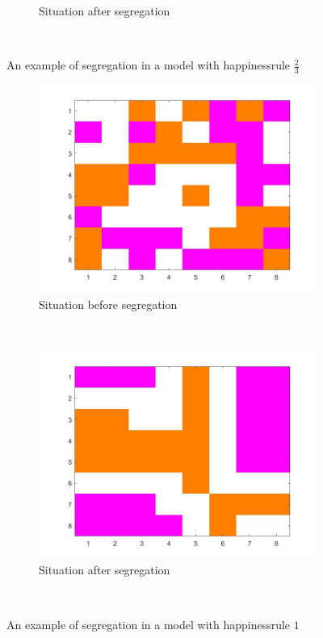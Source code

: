 \begin{figure}[H]
\begin{subfigure}{0.4\textwidth}
        \caption{Situation after segregation}
        \label{fig:example hap 2/3 end}
    \end{subfigure}
    ~ 
    \caption{An example of segregation in a model with happinessrule $\frac{2}{3}$}
    \label{fig:examplehap2/3}
\end{figure}

\begin{figure}[H]
	\centering
    \begin{subfigure}{0.4\textwidth}
        \includegraphics[width=\textwidth]{vb4beginbord.jpg}
        \caption{Situation before segregation}
        \label{fig:example hap 1 begin}
    \end{subfigure}\hspace{0cm}
    ~ 
    \begin{subfigure}{0.4\textwidth}
        \includegraphics[width=\textwidth]{vb4eindbord.jpg}
        \caption{Situation after segregation}
        \label{fig:example hap 1 end}
    \end{subfigure}
    ~ 
    \caption{An example of segregation in a model with happinessrule $1$}
    \label{fig:examplehap1}
\end{figure}

